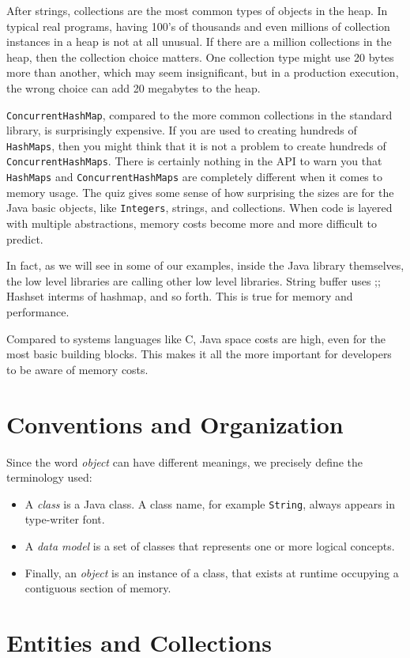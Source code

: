 After strings, collections are the most common types of objects in the heap. In typical real programs, having 100's of 
thousands and even millions of collection instances in a heap is not at all unusual. If there are a million collections 
in the heap, then the collection choice matters. One collection type might use 20 bytes more than another, 
which may seem insignificant, but in a production execution, the wrong choice can add 20 megabytes to the heap.

\texttt{ConcurrentHashMap}, compared to the more common collections in the standard library, is surprisingly expensive. 
If you are used to creating hundreds of \texttt{HashMaps}, then you might think that it is not a problem to create hundreds 
of \texttt{ConcurrentHashMaps}. There is certainly nothing in the API to warn you that \texttt{HashMaps} and 
\texttt{ConcurrentHashMaps} are completely different when it comes to memory usage. 
The quiz gives some sense of how surprising the sizes are for the Java basic objects, like \texttt{Integers}, 
strings, and collections. When code is layered with multiple abstractions, memory costs become more and more difficult 
to predict.



In fact, as we will see in some of our examples, inside the Java library themselves, the low level libraries are calling
 other low level libraries.  String buffer uses ;;  Hashset interms of hashmap, and so forth.  
 This is true for memory and performance.

Compared to systems languages like C, Java space costs are high, even for the most basic building blocks. 
This makes it all the more important for developers to be aware of memory costs.


\section{Conventions and Organization}


Since the word \textit{object} can have different meanings, we precisely define the terminology used:
\begin{itemize}
\item A \textit{class} is a Java class. A class name, for example \texttt{String}, always appears in type-writer font. 
\item A \textit{data model} is a set of classes that represents one or more logical concepts.
\item Finally, an \textit{object} is an instance of a class, that exists at runtime occupying a contiguous section of memory.
\end{itemize} 


\section{Entities and Collections}





 

